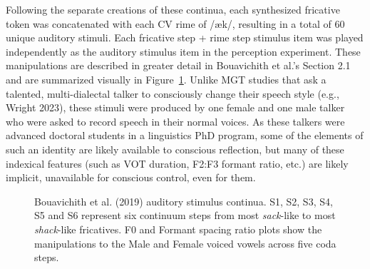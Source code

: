 \documentclass[
  letterpaper,
  DIV=11,
  numbers=noendperiod]{scrartcl}
\begin{document}
Following the separate creations of these continua, each synthesized
fricative token was concatenated with each CV rime of /æk/, resulting in
a total of 60 unique auditory stimuli. Each fricative step + rime step
stimulus item was played independently as the auditory stimulus item in
the perception experiment. These manipulations are described in greater
detail in Bouavichith et al.'s Section 2.1 and are summarized visually
in Figure~\ref{fig-stimuli}. Unlike MGT studies that ask a talented,
multi-dialectal talker to consciously change their speech style (e.g.,
Wright 2023), these stimuli were produced by one female and one male
talker who were asked to record speech in their normal voices. As these
talkers were advanced doctoral students in a linguistics PhD program,
some of the elements of such an identity are likely available to
conscious reflection, but many of these indexical features (such as VOT
duration, F2:F3 formant ratio, etc.) are likely implicit, unavailable
for conscious control, even for them.

\begin{figure}


\caption{\label{fig-stimuli}Bouavichith et al. (2019) auditory stimulus
continua. S1, S2, S3, S4, S5 and S6 represent six continuum steps from
most \emph{sack}-like to most \emph{shack}-like fricatives. F0 and
Formant spacing ratio plots show the manipulations to the Male and
Female voiced vowels across five coda steps.}

\end{figure}%
\end{document}
